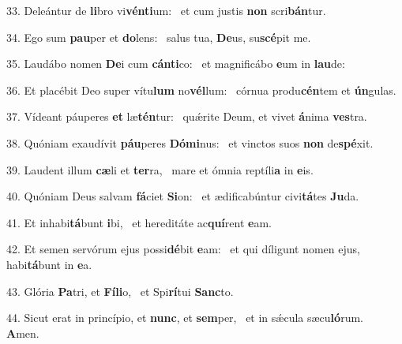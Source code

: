 33. Deleántur de \textbf{li}bro vi\textbf{vén}\textbf{ti}um: \ast\  et cum justis \textbf{non} scri\textbf{bán}tur.\

34. Ego sum \textbf{pau}per et \textbf{do}lens: \ast\  salus tua, \textbf{De}us, su\textbf{scé}pit me.\

35. Laudábo nomen \textbf{De}i cum \textbf{cán}\textbf{ti}co: \ast\  et magnificábo \textbf{e}um in \textbf{lau}de:\

36. Et placébit Deo super vítu\textbf{lum} no\textbf{vél}lum: \ast\  córnua produ\textbf{cén}tem et \textbf{ún}gulas.\

37. Vídeant páuperes \textbf{et} læ\textbf{tén}tur: \ast\  quǽrite Deum, et vivet \textbf{á}nima \textbf{ves}tra.\

38. Quóniam exaudívit \textbf{páu}peres \textbf{Dó}\textbf{mi}nus: \ast\  et vinctos suos \textbf{non} de\textbf{spé}xit.\

39. Laudent illum \textbf{cæ}li et \textbf{ter}ra, \ast\  mare et ómnia reptíli\textbf{a} in \textbf{e}is.\

40. Quóniam Deus salvam \textbf{fá}ciet \textbf{Si}on: \ast\  et ædificabúntur civi\textbf{tá}tes \textbf{Ju}da.\

41. Et inhabi\textbf{tá}bunt \textbf{i}bi, \ast\  et hereditáte ac\textbf{quí}rent \textbf{e}am.\

42. Et semen servórum ejus possi\textbf{dé}bit \textbf{e}am: \ast\  et qui díligunt nomen ejus, habi\textbf{tá}bunt in \textbf{e}a.\

43. Glória \textbf{Pa}tri, et \textbf{Fí}\textbf{li}o, \ast\  et Spi\textbf{rí}tui \textbf{Sanc}to.\

44. Sicut erat in princípio, et \textbf{nunc}, et \textbf{sem}per, \ast\  et in sǽcula sæcu\textbf{ló}rum. \textbf{A}men.\

